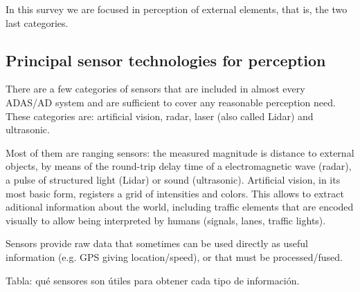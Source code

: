 In this survey we are focused in perception of external elements, that is, the
two last categories.

\subsection{Principal sensor technologies for perception}

There are a few categories of sensors that are included in almost every ADAS/AD
system and are sufficient to cover any reasonable perception need. 
These categories are: artificial vision, radar, laser (also called Lidar) and 
ultrasonic.

Most of them are ranging sensors: the measured magnitude is distance to 
external objects, by means of the round-trip delay time of a electromagnetic 
wave (radar), a pulse of structured light (Lidar) or sound (ultrasonic).
Artificial vision, in its most basic form, registers a grid of intensities and 
colors. This allows to extract aditional information about the world, including 
traffic elements that are encoded visually to allow being interpreted by humans 
(signals, lanes, traffic lights).

Sensors provide raw data that sometimes can be used directly as useful
information (e.g. GPS giving location/speed), or that must be processed/fused.

Tabla: qué sensores son útiles para obtener cada tipo de información.

